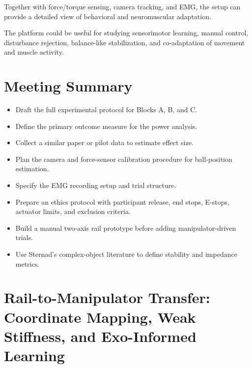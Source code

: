 \documentclass[11pt, a4paper]{article}
\begin{document}
Together with force/torque sensing, camera tracking, and EMG, the setup can provide a detailed view of behavioral and neuromuscular adaptation.

\begin{successbox}
The platform could be useful for studying sensorimotor learning, manual control, disturbance rejection, balance-like stabilization, and co-adaptation of movement and muscle activity.
\end{successbox}

\section{Meeting Summary}

\begin{actionbox}
\begin{itemize}[nosep]
  \item Draft the full experimental protocol for Blocks A, B, and C.
  \item Define the primary outcome measure for the power analysis.
  \item Collect a similar paper or pilot data to estimate effect size.
  \item Plan the camera and force-sensor calibration procedure for ball-position estimation.
  \item Specify the EMG recording setup and trial structure.
  \item Prepare an ethics protocol with participant release, end stops, E-stops, actuator limits, and exclusion criteria.
  \item Build a manual two-axis rail prototype before adding manipulator-driven trials.
  \item Use Sternad's complex-object literature to define stability and impedance metrics.
\end{itemize}
\end{actionbox}

\section{Rail-to-Manipulator Transfer: Coordinate Mapping, Weak Stiffness, and Exo-Informed Learning}
\label{sec:rail-transfer}
\end{document}
